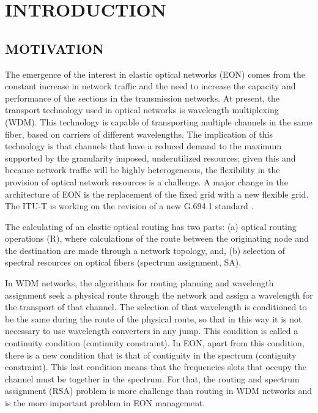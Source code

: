 
\chapter{INTRODUCTION}

\section{MOTIVATION }

The emergence of the interest in elastic optical networks (EON) comes
from the constant increase in network traffic and the need to increase
the capacity and performance of the sections in the transmission networks.
At present, the transport technology used in optical networks is wavelength
multiplexing (WDM). This technology is capable of transporting multiple
channels in the same fiber, based on carriers of different wavelengths.
The implication of this technology is that channels that have a reduced
demand to the maximum supported by the granularity imposed, underutilized
resources; given this and because network traffic will be highly heterogeneous,
the flexibility in the provision of optical network resources is a
challenge. A major change in the architecture of EON is the replacement
of the fixed grid with a new flexible grid. The ITU-T is working on
the revision of a new G.694.1 standard \cite{huang2012}. 

The calculating of an elastic optical routing has two parts: (a) optical
routing operations (R), where calculations of the route between the
originating node and the destination are made through a network topology,
and, (b) selection of spectral resources on optical fibers (spectrum
assignment, SA). 

In WDM networks, the algorithms for routing planning and wavelength
assignment seek a physical route through the network and assign a
wavelength for the transport of that channel. The selection of that
wavelength is conditioned to be the same during the route of the physical
route, so that in this way it is not necessary to use wavelength converters
in any jump. This condition is called a continuity condition (continuity
constraint). In EON, apart from this condition, there is a new condition
that is that of contiguity in the spectrum (contiguity constraint).
This last condition means that the frequencies slots that occupy the
channel must be together in the spectrum. For that, the routing and
spectrum assignment (RSA) problem is more challenge than routing in
WDM networks and is the more important problem in EON management. 


